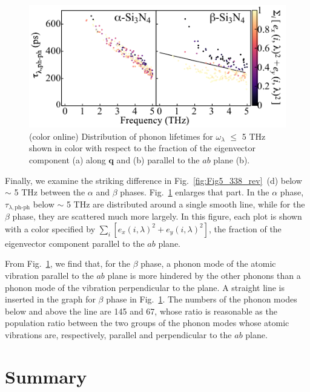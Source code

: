 \documentclass[twocolumn,amsmath,amssymb,a4paper,prb,superscriptaddress,floatfix]{revtex4-1}
\begin{document}
\begin{figure}[ht]
         \centering
           \includegraphics[width=\linewidth]{figure_analyze_gamma3_m1010_nolog_gray_only_ab.pdf} \caption{(color
                          online) Distribution of phonon lifetimes for $\omega_\lambda$ $\leq$ 5 THz
                          shown in color with respect to the fraction of the eigenvector
                          component (a) along $\mathbf q$
                          and (b) parallel to the $ab$ plane (b).} \label{fig:Fig7_338}
           \centering
\end{figure}

Finally, we examine the striking difference in Fig.~\ref{fig:Fig5_338_rev}~(d)
below $\sim$ 5 THz between the $\alpha$ and $\beta$ phases.
Fig.~\ref{fig:Fig7_338} enlarges that part.  In the $\alpha$ phase,
$\tau_{\lambda,\text{ph-ph}}$ below $\sim$ 5 THz are distributed around a single
smooth line, while for the $\beta$ phase, they are scattered much more largely.
In this figure, each plot is shown with a color specified by
$\sum_{i}[e_x(i,\lambda)^2+e_y(i,\lambda)^2]$, the fraction of the eigenvector
component parallel to the $ab$ plane.

From Fig.~\ref{fig:Fig7_338}, we find that, for the $\beta$ phase,
a phonon mode of the atomic vibration parallel to the $ab$ plane is more hindered by
the other phonons than a phonon mode of the vibration
perpendicular to the plane.
A straight line is inserted in the graph for $\beta$ phase in
Fig.~\ref{fig:Fig7_338}.  The numbers of the phonon modes below and above the
line are 145 and 67, whose ratio is reasonable as the population ratio between
the two groups of the phonon modes whose atomic vibrations are, respectively,
parallel and perpendicular to the $ab$ plane.


\section{Summary}
\end{document}
